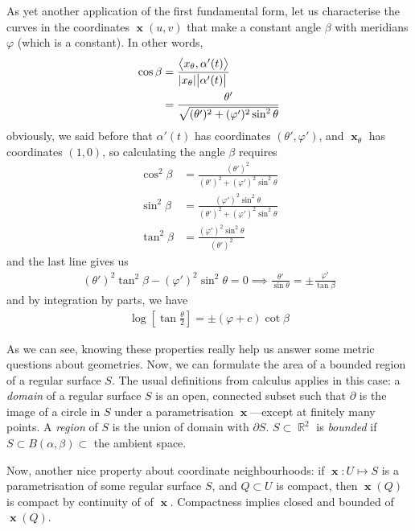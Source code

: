 \documentclass{amsart} %
\theoremstyle{mytheoremstyle}
\theoremstyle{definition}
\numberwithin{equation}{section}
\DeclareMathOperator{\R}{\mathbb{R}}
\DeclareMathOperator{\1}{\mathbbm{1}}
\DeclareMathOperator{\x}{\mathbf{x}}
\renewcommand{\phi}{\varphi}
\newcommand{\innerproduct}[2]{\left\langle #1,#2 \right\rangle}
\renewcommand{\phi}{\varphi}
\begin{document}
As yet another application of the first fundamental form, let us characterise the curves in the coordinates $\x(u,v)$ that make a constant angle $\beta$ with meridians $\phi$ (which is a constant). In other words,
\begin{align*}
\cos \beta &= \frac{\innerproduct{x_\theta}{\alpha'(t)}}{\abs{x_{\theta}} \abs{\alpha'(t)}} \\
&=\frac{\theta'}{\sqrt{(\theta')^2 + (\phi')^2 \sin ^2 \theta}}
\end{align*}
obviously, we said before that $\alpha'(t)$ has coordinates $(\theta',\phi')$, and $\x_{\theta} $ has coordinates $(1,0)$, so calculating the angle $\beta$ requires
\begin{align*}
\cos^2 \beta &= \frac{(\theta')^2}{(\theta')^2 + (\phi')^2 \sin ^2 \theta} \\
\sin^2 \beta &= \frac{ (\phi')^2 \sin ^2 \theta }{(\theta')^2 + (\phi')^2 \sin ^2 \theta} \\
\tan^2 \beta &= \frac{(\phi')^2 \sin ^2 \theta}{(\theta')^2}
\end{align*}
and the last line gives us 
\begin{align*}
(\theta')^2 \tan^2 \beta -  (\phi')^2 \sin ^2 \theta = 0 \implies \frac{\theta'}{\sin \theta} = \pm \frac{\phi'}{\tan \beta}
\end{align*}
and by integration by parts, we have
\begin{align}
\label{eqanglebetweencoordinatescurves}
\log \left[ \tan \frac{\theta}{2} \right] = \pm (\phi + c) \cot \beta
\end{align}


As we can see, knowing these properties really help us answer some metric questions about geometries. Now, we can formulate the area of a bounded region of a regular surface $S$. The usual definitions from calculus applies in this case: a \textit{domain} of a regular surface $S$ is an open, connected subset such that $\partial $ is the image of a circle in $S$ under a  parametrisation $\x$---except at finitely many points. A \textit{region} of $S$ is the union of domain with $\partial S$. $S \subset \R^2 $ is \textit{bounded} if $S \subset B(\alpha,\beta) \subset $ the ambient space.

Now, another nice property about coordinate neighbourhoods: if $\x : U \mapsto S$ is a parametrisation of some regular surface $S$, and $Q \subset U$ is compact, then $\x(Q)$ is compact by continuity of of $\x$. Compactness implies closed and bounded of $\x(Q)$.
\end{document}
